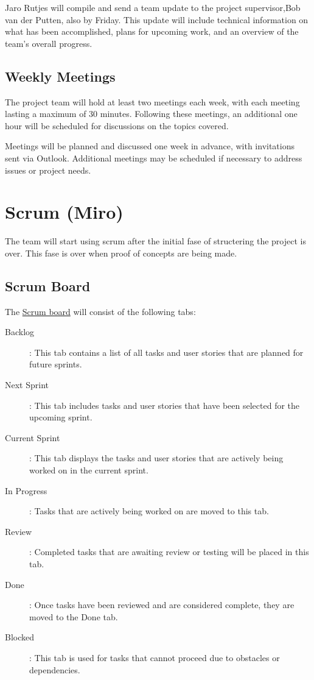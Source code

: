 \documentclass{projdoc}
\begin{document}
Jaro Rutjes will compile and send a team update to the project supervisor,Bob 
van der Putten, also by Friday. This update will include technical information 
on what has been accomplished, plans for upcoming work, and an overview of the 
team's overall progress.

\subsection{Weekly Meetings}
The project team will hold at least two meetings each week, with each meeting 
lasting a maximum of 30 minutes. Following these meetings, an additional one 
hour will be scheduled for discussions on the topics covered.

Meetings will be planned and discussed one week in advance, with invitations 
sent via Outlook. Additional meetings may be scheduled if necessary to address 
issues or project needs.

\newpage

\section{Scrum (Miro)}

The team will start using scrum after the initial fase of structering the project is over. This fase is over when proof of concepts are being made.

\subsection{Scrum Board}
The \href{https://miro.com/app/board/uXjVKjtdM64=/?share_link_id=303851465474}{Scrum board} will consist of the following tabs:

\begin{description}
	\item[Backlog]: This tab contains a list of all tasks and user stories that are planned for future sprints.
	\item[Next Sprint]: This tab includes tasks and user stories that have been selected for the upcoming sprint.
	\item[Current Sprint]: This tab displays the tasks and user stories that are actively being worked on in the current sprint.
	\item[In Progress]: Tasks that are actively being worked on are moved to this tab.
	\item[Review]: Completed tasks that are awaiting review or testing will be placed in this tab.
	\item[Done]: Once tasks have been reviewed and are considered complete, they are moved to the Done tab.
	\item [Blocked]: This tab is used for tasks that cannot proceed due to obstacles or dependencies.
\end{description}
\end{document}
